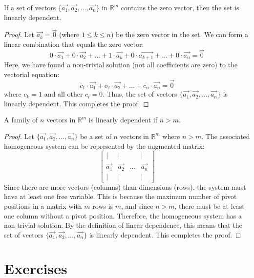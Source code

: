 \begin{theorem}
    If a set of vectors $\{\vec{a_1}, \vec{a_2}, \ldots, \vec{a_n}\}$ in $\mathbb{R}^m$ contains the zero vector, then the set is linearly dependent.
\end{theorem}
\begin{proof}
    Let $\vec{a_k} = \vec{0}$ (where $1 \leq k \leq n$) be the zero vector in the set. We can form a linear combination that equals the zero vector:
    \[
        0 \cdot \vec{a_1} + 0 \cdot \vec{a_2} + \ldots + 1 \cdot \vec{a_k} + 0 \cdot \vec{a_{k+1}} + \ldots + 0 \cdot \vec{a_n} = \vec{0}
    \]
    Here, we have found a non-trivial solution (not all coefficients are zero) to the vectorial equation:
    \[
        c_1 \cdot \vec{a_1} + c_2 \cdot \vec{a_2} + \ldots + c_n \cdot \vec{a_n} = \vec{0}
    \]
    where $c_k = 1$ and all other $c_i = 0$. Thus, the set of vectors $\{\vec{a_1}, \vec{a_2}, \ldots, \vec{a_n}\}$ is linearly dependent. This completes the proof.
\end{proof}

\begin{theorem}
    A family of $n$ vectors in $\mathbb{R}^m$ is linearly dependent if $n > m$.
\end{theorem}
\begin{proof}
    Let $\{\vec{a_1}, \vec{a_2}, \ldots, \vec{a_n}\}$ be a set of $n$ vectors in $\mathbb{R}^m$ where $n > m$. The associated homogeneous system can be represented by the augmented matrix:
    \[
        \begin{bmatrix}
            | & | & & | \\
            \vec{a_1} & \vec{a_2} & \ldots & \vec{a_n} \\
            | & | & & |
        \end{bmatrix}
    \]
    Since there are more vectors (columns) than dimensions (rows), the system must have at least one free variable. This is because the maximum number of pivot positions in a matrix with $m$ rows is $m$, and since $n > m$, there must be at least one column without a pivot position. Therefore, the homogeneous system has a non-trivial solution. By the definition of linear dependence, this means that the set of vectors $\{\vec{a_1}, \vec{a_2}, \ldots, \vec{a_n}\}$ is linearly dependent. This completes the proof.
\end{proof}

\section{Exercises}
